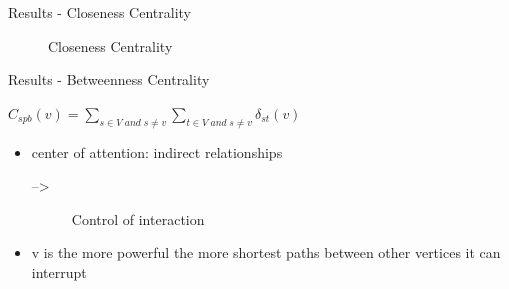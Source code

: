 \begin{frame}{Results - Closeness Centrality}
	\begin{figure}
	\hfill
	\caption{Closeness Centrality}
	\end{figure}
\end{frame}
\begin{frame}{Results - Betweenness Centrality}
	\begin{definition}
		$C_{spb}(v)=\sum\limits_{s \in V\; and\; s \neq v} \sum\limits_{t \in V\; and\; s \neq v} \delta_{st}(v)$
	\end{definition}
	\begin{itemize}
		\item center of attention: indirect relationships 
		\begin{description}
			\item[-->] Control of interaction
		\end{description}
		\item v is the more powerful the more shortest paths between other vertices it can interrupt
	\end{itemize}
\end{frame}

